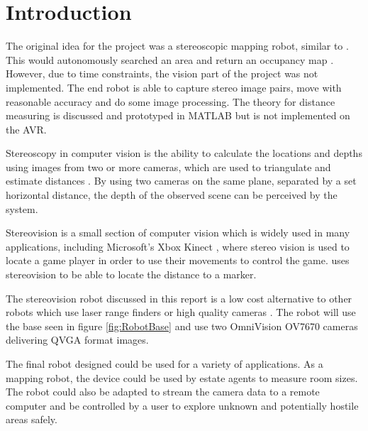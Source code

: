 \chapter{Introduction} \label{Chapter:Introduction}

%
%
%
%


The original idea for the project was a stereoscopic mapping robot, similar to \cite{Pirobot}. This would autonomously searched an area and return an occupancy map \cite{thrun2003learning}. However, due to time constraints, the vision part of the project was not implemented. The end robot is able to capture stereo image pairs, move with reasonable accuracy and do some image processing. The theory for distance measuring is discussed and prototyped in MATLAB but is not implemented on the AVR.

Stereoscopy in computer vision is the ability to calculate the locations and depths using images from two or more cameras, which are used to triangulate and estimate distances \citep{Saxena:DepthEstimation}. By using two cameras on the same plane, separated by a set horizontal distance, the depth of the observed scene can be perceived by the system.

Stereovision is a small section of computer vision which is widely used in many applications, including Microsoft's Xbox Kinect \citep{Microsoft:Kinect}, where stereo vision is used to locate a game player in order to use their movements to control the game. \cite{Mrovlje:Distance_Stereoscopic} uses stereovision to be able to locate the distance to a marker. 

The stereovision robot discussed in this report is a low cost alternative to other robots which use laser range finders or high quality cameras \citep{Se:MappingRobot}. The robot will use the base seen in figure \ref{fig:RobotBase} and use two OmniVision OV7670 cameras delivering QVGA format images.

The final robot designed could be used for a variety of applications. As a mapping robot, the device could be used by estate agents to measure room sizes. The robot could also be adapted to stream the camera data to a remote computer and be controlled by a user to explore unknown and potentially hostile areas safely. 

